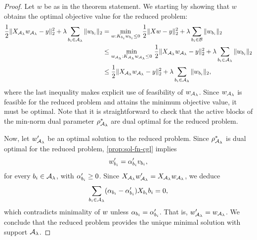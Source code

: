 
\constraintReduced*
\begin{proof}
	Let \( w \) be as in the theorem statement.
	We starting by showing that \( w \) obtains the optimal objective value
	for the reduced problem:
	\begin{align*}
		\frac 1 2 \|X_{\mathcal{A}_{\lambda}} w_{\mathcal{A}_{\lambda}} - y\|_2^2 + \lambda \sum_{{b_i} \in {\mathcal{A}_{\lambda}}} \|w_{b_i}\|_2
		 & =
		\min_{w : K_{{b_i}} w_{b_i} \leq 0} \,
		\frac 1 2 \|X w - y\|_2^2 + \lambda \sum_{{b_i} \in \mathcal{B}} \|w_{b_i}\|_2                                   \\
		 & \leq
		\min_{w_{\mathcal{A}_{\lambda}} : K_{\mathcal{A}_{\lambda}} w_{\mathcal{A}_{\lambda}} \leq 0} \, \frac 1 2 \|X_{\mathcal{A}_{\lambda}} w_{\mathcal{A}_{\lambda}} - y\|_2^2 + \lambda \sum_{{b_i} \in {\mathcal{A}_{\lambda}}} \|w_{b_i}\|_2 \\
		 & \leq \frac 1 2 \|X_{\mathcal{A}_{\lambda}} w_{\mathcal{A}_{\lambda}} - y\|_2^2 + \lambda \sum_{{b_i} \in {\mathcal{A}_{\lambda}}} \|w_{b_i}\|_2,
	\end{align*}
	where the last inequality makes explicit use of feasibility of \( w_{\mathcal{A}_{\lambda}} \).
	Since \( w_{\mathcal{A}_{\lambda}} \) is feasible for the reduced problem and attains the
	minimum objective value, it must be optimal.
	Note that it is straightforward to check that the active blocks of the min-norm
	dual parameter \( \rho^*_{\mathcal{A}_{\lambda}} \) are dual optimal for the reduced problem.

	Now, let \( w_{\mathcal{A}_{\lambda}}' \) be an optimal solution to the reduced problem.
	Since \( \rho^*_{\mathcal{A}_{\lambda}} \) is dual optimal for the reduced problem,
	\cref{prop:sol-fn-cgl} implies
	\[
		w_{b_i}' = \alpha_{b_i}' v_{b_i},
	\]
	for every \( {b_i} \in {\mathcal{A}_{\lambda}} \), with \( \alpha_{b_i}' \geq 0 \).
	Since \( X_{\mathcal{A}_{\lambda}} w_{\mathcal{A}_{\lambda}}' = X_{\mathcal{A}_{\lambda}} w_{\mathcal{A}_{\lambda}} \), we deduce
	\[
		\sum_{{b_i} \in {\mathcal{A}_{\lambda}}} (\alpha_{b_i} - \alpha_{b_i}')X_{b_i} {b_i} = 0,
	\]
	which contradicts minimality of \( w \) unless \( \alpha_{b_i} = \alpha_{b_i}' \).
	That is, \( w_{\mathcal{A}_{\lambda}}' = w_{\mathcal{A}_{\lambda}} \).
	We conclude that the reduced problem provides the unique minimal solution
	with support \( {\mathcal{A}_{\lambda}} \).
\end{proof}

